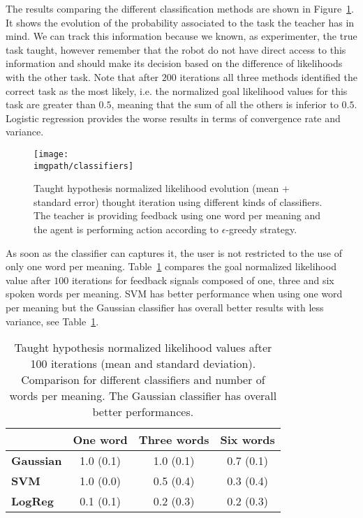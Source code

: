 The results comparing the different classification methods are shown in Figure~\ref{fig:FeedbackOneWord}. It shows the evolution of the probability associated to the task the teacher has in mind. We can track this information because we known, as experimenter, the true task taught, however remember that the robot do not have direct access to this information and should make its decision based on the difference of likelihoods with the other task. Note that after $200$ iterations all three methods identified the correct task as the most likely, i.e. the normalized goal likelihood values for this task are greater than $0.5$, meaning that the sum of all the others is inferior to $0.5$. Logistic regression provides the worse results in terms of convergence rate and variance.

\begin{figure}[!ht]
  \centering
  \texttt{[image: \\imgpath/classifiers]}
  \caption{Taught hypothesis normalized likelihood evolution (mean + standard error) thought iteration using different kinds of classifiers. The teacher is providing feedback using one word per meaning and the agent is performing action according to $\epsilon$-greedy strategy.}
  \label{fig:FeedbackOneWord}
\end{figure}

As soon as the classifier can captures it, the user is not restricted to the use of only one word per meaning. Table~\ref{tab:1} compares the goal normalized likelihood value after $100$ iterations for feedback signals composed of one, three and six spoken words per meaning. SVM has better performance when using one word per meaning but the Gaussian classifier has overall better results with less variance, see Table~\ref{tab:1}. 

\begin{table}[!ht]
\centering
\begin{tabular}{|l|c|c|c|}
\hline
&\textbf{One word}&\textbf{Three words}&\textbf{Six words}\\\hline
\textbf{Gaussian}&1.0 (0.1)&1.0 (0.1)&0.7 (0.1)\\\hline
\textbf{SVM}&1.0 (0.0)&0.5 (0.4)&0.3 (0.4)\\\hline
\textbf{LogReg}&0.1 (0.1)&0.2 (0.3)&0.2 (0.3)\\\hline
\end{tabular}
\caption{Taught hypothesis normalized likelihood values after 100 iterations (mean and standard deviation). Comparison for different classifiers and number of words per meaning. The Gaussian classifier has overall better performances.}
\label{tab:1}
\end{table}


